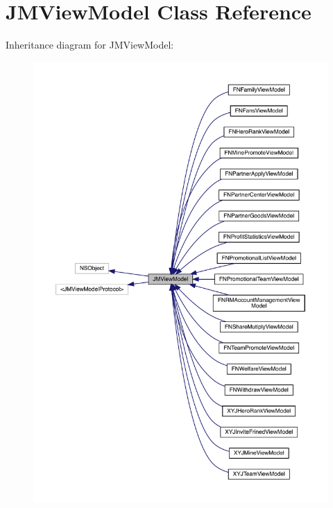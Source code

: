 \hypertarget{interface_j_m_view_model}{}\section{J\+M\+View\+Model Class Reference}
\label{interface_j_m_view_model}


Inheritance diagram for J\+M\+View\+Model\+:\nopagebreak
\begin{figure}[H]
\begin{center}
\leavevmode
\includegraphics[width=350pt]{interface_j_m_view_model__inherit__graph}
\end{center}
\end{figure}


